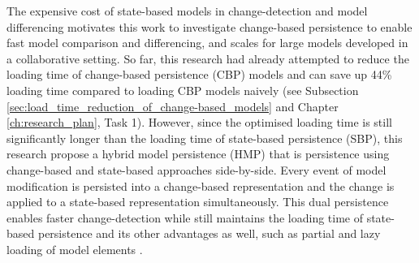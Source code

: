 \documentclass[12pt, a4paper]{report} \usepackage[titletoc]{appendix}
\begin{document}
The expensive cost of state-based models in change-detection and model differencing motivates this work to investigate change-based persistence to enable fast model comparison and differencing, and scales for large models developed in a collaborative setting. So far, this research had already attempted to reduce the loading time of change-based persistence (CBP) models and can save up 44\% loading time compared to loading CBP models naively (see Subsection \ref{sec:load_time_reduction_of_change-based_models} and Chapter \ref{ch:research_plan}, Task 1). However, since the optimised loading time is still significantly longer than the loading time of state-based persistence (SBP), this research propose a hybrid model persistence (HMP) that is persistence using change-based and state-based approaches side-by-side. Every event of model modification is persisted into a change-based representation and the change is applied to a state-based representation simultaneously. This dual persistence enables faster change-detection while still maintains the loading time of state-based persistence and its other advantages as well, such as partial and lazy loading of model elements \cite{ran2016partial,daniel2016neoemf}.  
\end{document}
